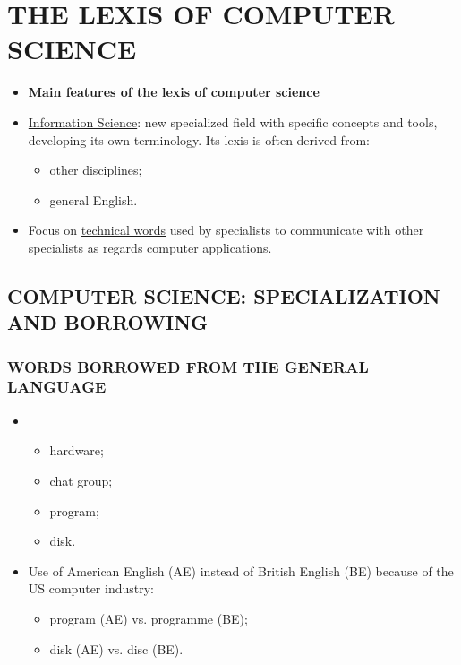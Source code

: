 \section{THE LEXIS OF COMPUTER SCIENCE}

\begin{itemize}

\item\textbf{Main features of the lexis of computer science}

\item\underline{Information Science}: new specialized field with specific concepts and tools, developing its own terminology. Its lexis is often derived from: 

\begin{itemize}
\item other disciplines;
\item general English.
\end{itemize}

\item Focus on \underline{technical words} used by specialists to communicate with other specialists as regards computer applications.

\end{itemize}

\subsection{COMPUTER SCIENCE: SPECIALIZATION AND BORROWING} 

\subsubsection{WORDS BORROWED FROM THE GENERAL LANGUAGE}

\begin{itemize}

\item

\begin{itemize}
\item hardware;
\item chat group;
\item program;
\item disk.
\end{itemize}

\item Use of American English (AE) instead of British English (BE) because of the US computer industry:

\begin{itemize}
\item program (AE) vs. programme (BE);
\item disk (AE) vs. disc (BE). 
\end{itemize}

\end{itemize}

